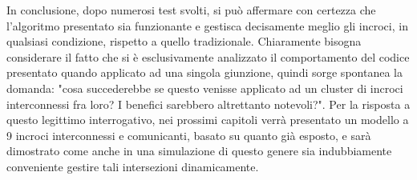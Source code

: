 In conclusione, dopo numerosi test svolti, si può affermare con certezza che l'algoritmo presentato sia funzionante e gestisca decisamente meglio gli incroci, in qualsiasi condizione, rispetto a quello tradizionale. Chiaramente bisogna considerare il fatto che si è esclusivamente analizzato il comportamento del codice presentato quando applicato ad una singola giunzione, quindi sorge spontanea la domanda: "cosa succederebbe se questo venisse applicato ad un cluster di incroci interconnessi fra loro? I benefici sarebbero altrettanto notevoli?". Per la risposta a questo legittimo interrogativo, nei prossimi capitoli verrà presentato un modello a 9 incroci interconnessi e comunicanti, basato su quanto già esposto, e sarà dimostrato come anche in una simulazione di questo genere sia indubbiamente conveniente gestire tali intersezioni dinamicamente.



























